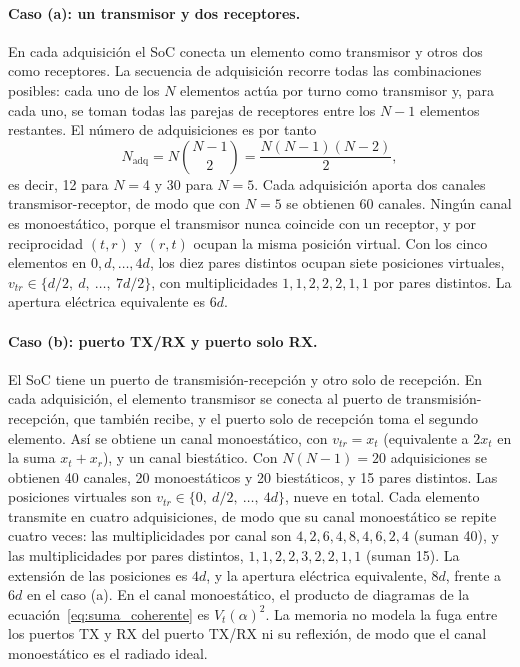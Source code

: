 \documentclass[11pt,a4paper]{article}
\begin{document}
\paragraph{Caso (a): un transmisor y dos receptores.} En cada adquisición el SoC conecta un elemento
como transmisor y otros dos como receptores. La secuencia de adquisición recorre todas las
combinaciones posibles: cada uno de los $N$ elementos actúa por turno como transmisor y, para cada
uno, se toman todas las parejas de receptores entre los $N-1$ elementos restantes. El número de
adquisiciones es por tanto
\begin{equation}
    N_\mathrm{adq} = N\binom{N-1}{2} = \frac{N(N-1)(N-2)}{2},
\end{equation}
es decir, 12 para $N = 4$ y 30 para $N = 5$. Cada adquisición aporta dos canales
transmisor-receptor, de modo que con $N = 5$ se obtienen 60 canales. Ningún canal es monoestático, porque el
transmisor nunca coincide con un receptor, y por reciprocidad $(t,r)$ y $(r,t)$ ocupan la misma posición
virtual. Con los cinco elementos en $0, d, \dots, 4d$, los diez pares distintos ocupan siete posiciones
virtuales, $v_{tr} \in \{d/2,\ d,\ \dots,\ 7d/2\}$, con multiplicidades $1, 1, 2, 2, 2, 1, 1$ por pares
distintos. La apertura eléctrica equivalente es $6d$.

\paragraph{Caso (b): puerto TX/RX y puerto solo RX.} El SoC tiene un puerto de transmisión-recepción y otro solo de recepción. En cada adquisición, el elemento
transmisor se conecta al puerto de transmisión-recepción, que también recibe, y el puerto solo de recepción
toma el segundo elemento. Así se obtiene un canal monoestático, con $v_{tr} = x_t$ (equivalente a
$2x_t$ en la suma $x_t + x_r$), y un canal biestático. Con $N(N-1) = 20$ adquisiciones se obtienen 40
canales, 20 monoestáticos y 20 biestáticos, y 15 pares distintos. Las posiciones virtuales son
$v_{tr} \in \{0,\ d/2,\ \dots,\ 4d\}$, nueve en total. Cada elemento transmite en cuatro adquisiciones,
de modo que su canal monoestático se repite cuatro veces: las multiplicidades por canal son
$4, 2, 6, 4, 8, 4, 6, 2, 4$ (suman 40), y las multiplicidades por pares distintos, $1, 1, 2, 2, 3, 2, 2, 1, 1$
(suman 15). La extensión de las posiciones es $4d$, y la apertura eléctrica equivalente, $8d$, frente a
$6d$ en el caso (a). En el canal monoestático, el producto de diagramas de la
ecuación~\eqref{eq:suma_coherente} es $V_t(\alpha)^2$. La memoria no modela la fuga entre los puertos
TX y RX del puerto TX/RX ni su reflexión, de modo que el canal monoestático es el radiado ideal.
\end{document}

